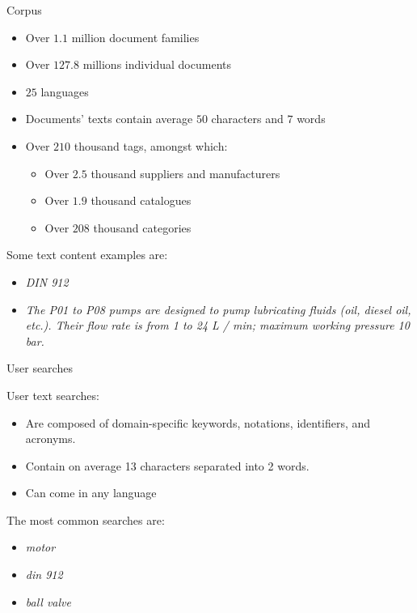 \begin{frame}{Corpus}
    
    \begin{itemize}
        \item Over $1.1$ million document families
        \item Over $127.8$ millions individual documents
        \item $25$ languages
        \item Documents' texts contain average $50$ characters and $7$ words
        \item Over $210$ thousand tags, amongst which:
        \begin{itemize}
            \item Over $2.5$ thousand suppliers and manufacturers
            \item Over $1.9$ thousand catalogues
            \item Over $208$ thousand categories
        \end{itemize}
    \end{itemize}

    Some text content examples are:
    \begin{itemize}
        \item \emph{DIN 912}
        \item \emph{The P01 to P08 pumps are designed to pump lubricating fluids (oil, diesel oil, etc.). Their flow rate is from 1 to 24 L / min; maximum working pressure 10 bar.} 
    \end{itemize}

\end{frame}

\begin{frame}{User searches}
    
    User text searches:
    \begin{itemize}
        \item Are composed of domain-specific keywords, notations, identifiers, and
        acronyms.
        \item Contain on average 13 characters separated into 2 words.
        \item Can come in any language
    \end{itemize}

    The most common searches are:
    \begin{itemize}
        \item \emph{motor}
        \item \emph{din 912}
        \item \emph{ball valve}
    \end{itemize}

\end{frame}


